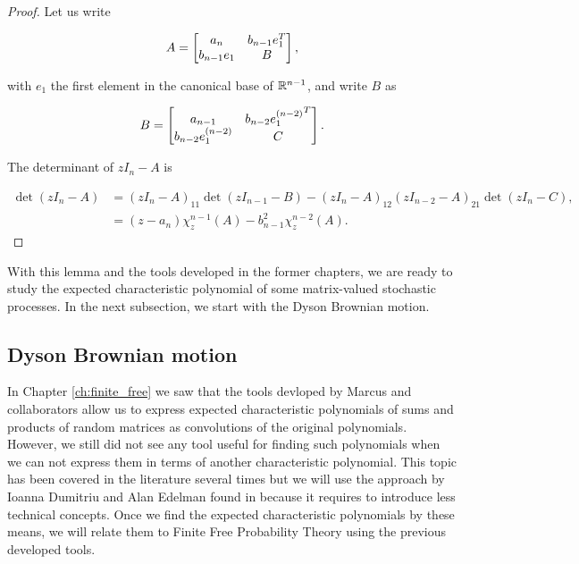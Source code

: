 \begin{proof}
    Let us write

    \begin{equation*}
        A = \begin{bmatrix}
            a_n   & b_{n-1} e_1^T \\
            b_{n-1}e_1 & B 
        \end{bmatrix},
    \end{equation*}

    \noindent with $e_1$ the first element in the canonical base of $\mathbb R^{n-1}$, and write $B$ as

    \begin{equation*}
        B = \begin{bmatrix}
            a_{n-1}   & b_{n-2} {e_1^{(n-2)}}^T \\
            b_{n-2} e_1^{(n-2)} & C 
        \end{bmatrix}.
    \end{equation*}

    The determinant of $zI_n - A$ is 

    \begin{align*}
        \det \left( zI_n - A \right) &= (zI_n - A)_{11}\det(zI_{n-1}-B) - (zI_n - A)_{12}(zI_{n-2} - A)_{21}\det(zI_n - C),\\ 
        &= (z - a_n)\chi^{n-1}_z(A) - b_{n-1}^2\chi^{n-2}_z(A).
    \end{align*}
\end{proof}

With this lemma and the tools developed in the former chapters, we are ready to study the expected characteristic polynomial of some matrix-valued stochastic processes. In the next subsection, we start with the Dyson Brownian motion.

\subsection{Dyson Brownian motion}

In Chapter \ref{ch:finite_free}  we saw that the tools devloped by Marcus and collaborators \cite{article:finitefree,article:arizmendi_perales,article:finitefree} allow us to express expected characteristic polynomials of sums and products of random matrices as convolutions of the original polynomials. However, we still did not see any tool useful for finding such polynomials when we can not express them in terms of another characteristic polynomial. This topic has been covered in the literature several times \cite{book:percy_deift_orthogonal,edelman1988eigenvalues,article:aomoto1987jacobi_selberg_integrals} but we will use the approach by Ioanna Dumitriu and Alan Edelman found in \cite{article:dumitriu_edelman} because it requires to introduce less technical concepts. Once we find the expected characteristic polynomials by these means, we will relate them to Finite Free Probability Theory using the previous developed tools.


